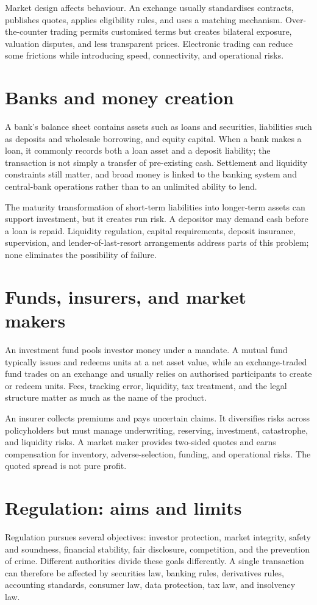 Market design affects behaviour. An exchange usually standardises contracts, publishes quotes, applies eligibility rules, and uses a matching mechanism. Over-the-counter trading permits customised terms but creates bilateral exposure, valuation disputes, and less transparent prices. Electronic trading can reduce some frictions while introducing speed, connectivity, and operational risks.

\section{Banks and money creation}
A bank's balance sheet contains assets such as loans and securities, liabilities such as deposits and wholesale borrowing, and equity capital. When a bank makes a loan, it commonly records both a loan asset and a deposit liability; the transaction is not simply a transfer of pre-existing cash. Settlement and liquidity constraints still matter, and broad money is linked to the banking system and central-bank operations rather than to an unlimited ability to lend.

The maturity transformation of short-term liabilities into longer-term assets can support investment, but it creates run risk. A depositor may demand cash before a loan is repaid. Liquidity regulation, capital requirements, deposit insurance, supervision, and lender-of-last-resort arrangements address parts of this problem; none eliminates the possibility of failure.

\section{Funds, insurers, and market makers}
An investment fund pools investor money under a mandate. A mutual fund typically issues and redeems units at a net asset value, while an exchange-traded fund trades on an exchange and usually relies on authorised participants to create or redeem units. Fees, tracking error, liquidity, tax treatment, and the legal structure matter as much as the name of the product.

An insurer collects premiums and pays uncertain claims. It diversifies risks across policyholders but must manage underwriting, reserving, investment, catastrophe, and liquidity risks. A market maker provides two-sided quotes and earns compensation for inventory, adverse-selection, funding, and operational risks. The quoted spread is not pure profit.

\section{Regulation: aims and limits}
Regulation pursues several objectives: investor protection, market integrity, safety and soundness, financial stability, fair disclosure, competition, and the prevention of crime. Different authorities divide these goals differently. A single transaction can therefore be affected by securities law, banking rules, derivatives rules, accounting standards, consumer law, data protection, tax law, and insolvency law.

